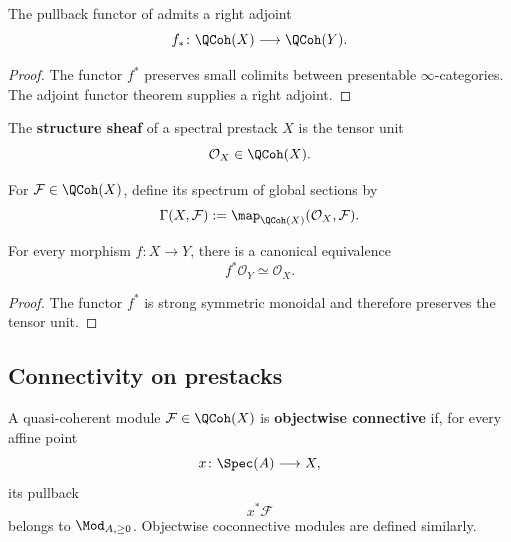 \begin{corollary}
\label{cor:qcoh-direct-image}
The pullback functor of  admits a right adjoint
\[
    f_*
    \colon
    \QCoh(X)
    \longrightarrow
    \QCoh(Y).
\]
\end{corollary}

\begin{proof}
The functor $f^*$ preserves small colimits between presentable
$\infty$-categories. The adjoint functor theorem supplies a right adjoint.
\end{proof}

\begin{definition}
\label{def:structure-sheaf-prestack}
The \textbf{structure sheaf} of a spectral prestack $X$ is the tensor unit
\[
    \mathcal O_X
    \in
    \QCoh(X).
\]
\end{definition}

\begin{definition}
\label{def:global-sections-qcoh}
For $\mathcal F\in\QCoh(X)$, define its spectrum of global sections by
\[
    \Gamma(X,\mathcal F)
    :=
    \map_{\QCoh(X)}
    (\mathcal O_X,\mathcal F).
\]
\end{definition}

\begin{proposition}
\label{prop:pullback-structure-sheaf}
For every morphism $f:X\to Y$, there is a canonical equivalence
\[
    f^*\mathcal O_Y
    \simeq
    \mathcal O_X.
\]
\end{proposition}

\begin{proof}
The functor $f^*$ is strong symmetric monoidal and therefore preserves the
tensor unit.
\end{proof}

\subsection{Connectivity on prestacks}

\begin{definition}
\label{def:objectwise-connective-qcoh}
A quasi-coherent module $\mathcal F\in\QCoh(X)$ is
\textbf{objectwise connective} if, for every affine point
\[
    x
    \colon
    \Spec(A)
    \longrightarrow
    X,
\]
its pullback
\[
    x^*\mathcal F
\]
belongs to $\Mod_{A,\geq0}$. Objectwise coconnective modules are defined
similarly.
\end{definition}

